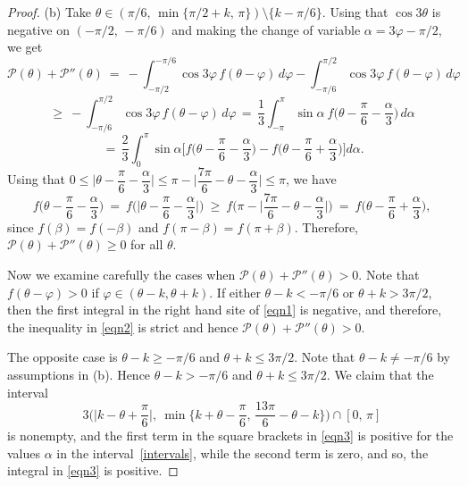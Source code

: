 \documentclass[10pt,a4paper]{amsart}
\newcommand {\PPP}{\mathcal{P}}
\begin{document}
\begin{proof}
(b) Take $\theta \in (\pi/6,\, \min\{\pi/2 + k,\, \pi \}) \setminus \{ k-\pi/6 \}$. Using that $\cos 3\theta$ is negative on $(-\pi/2,\, -\pi/6)$ and making the change of variable $\alpha = 3\varphi - \pi/2$, we get
\begin{equation}\label{eqn1}
\PPP(\theta) + \PPP''(\theta)\ =\
-\int_{-\pi/2}^{-\pi/6} \cos 3\varphi\, f(\theta-\varphi)\, d\varphi
-\int_{-\pi/6}^{\pi/2} \cos 3\varphi\, f(\theta-\varphi)\, d\varphi
 \end{equation}
 \begin{equation}\label{eqn2}
 \ge\
-\int_{-\pi/6}^{\pi/2} \cos 3\varphi\, f(\theta-\varphi)\, d\varphi\, =\,
\dfrac{1}{3}\int_{-\pi}^{\pi} \sin\alpha\ f\Big(\theta - \frac{\pi}{6} - \dfrac{\alpha}{3} \Big)\, d\alpha
\end{equation}
 \begin{equation}\label{eqn3}
\, =\,
\dfrac{2}{3}\int_{0}^{\pi} \sin\alpha
\Big[ f\Big(\theta - \frac{\pi}{6} - \dfrac{\alpha}{3} \Big) - f\Big(\theta - \frac{\pi}{6} + \dfrac{\alpha}{3} \Big)
\Big] d\alpha.
\end{equation}
Using that $0 \le \Big|\theta - \dfrac{\pi}{6} - \dfrac{\alpha}{3}\Big| \le \pi - \Big|\dfrac{7\pi}{6} - \theta - \dfrac{\alpha}{3}\Big| \le \pi$, we have
$$
f\Big(\theta - \dfrac{\pi}{6} - \dfrac{\alpha}{3} \Big)\ =\ f\Big(\Big|\theta - \dfrac{\pi}{6} - \dfrac{\alpha}{3} \Big|\Big)\ \ge\
f\Big(\pi - \Big|\dfrac{7\pi}{6} - \theta - \dfrac{\alpha}{3}\Big|\Big) \ =\ f\Big(\theta - \dfrac{\pi}{6} + \dfrac{\alpha}{3} \Big),$$
since $f(\beta)=f(-\beta)$ and $f(\pi-\beta)=f(\pi+\beta)$. Therefore, $\PPP(\theta) + \PPP''(\theta) \ge 0$ for all $\theta$.

Now we examine carefully the cases when $\PPP(\theta) + \PPP''(\theta) > 0$. Note that $f(\theta-\varphi)>0$ if $\varphi\in(\theta-k,\theta+k)$. If either $\theta - k<-\pi/6$ or $\theta + k > 3\pi/2$, then the first integral in the right hand site of \eqref{eqn1} is negative, and therefore, the inequality in \eqref{eqn2} is strict and hence $\PPP(\theta)+\PPP''(\theta)>0$.

The opposite case is $\theta -k \ge - \pi/6$ and $\theta + k \le 3\pi/2$. Note that $\theta-k\ne-\pi/6$ by assumptions in (b). Hence $\theta -k > - \pi/6$ and $\theta + k \le 3\pi/2$. We claim that the interval
\begin{equation}\label{intervals}
3\Big( \Big|k-\theta+\dfrac{\pi}{6}\Big|, \ \min\big\{ k+\theta-\dfrac{\pi}{6},\, \frac{13\pi}{6}-\theta-k \big\}\Big) \cap [0,\, \pi]
\end{equation}
is nonempty, and the first term in the square brackets in \eqref{eqn3} is positive for the values $\alpha$ in the interval~\eqref{intervals}, while the second term is zero, and so, the integral in \eqref{eqn3} is positive.


\end{proof}
\end{document}
